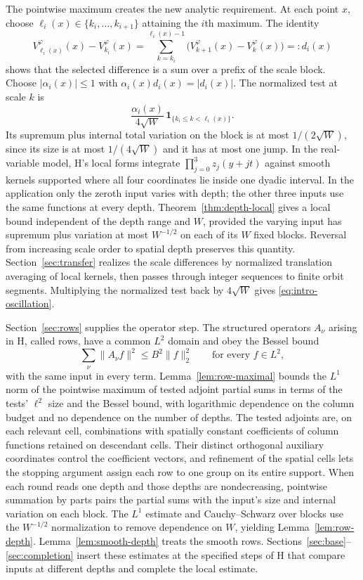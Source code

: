 The pointwise maximum creates the new analytic requirement.  At each point
$x$, choose $\ell_i(x)\in\{k_i,\ldots,k_{i+1}\}$ attaining the $i$th maximum.
The identity
\[
 V_{\ell_i(x)}^\varphi(x)-V_{k_i}^\varphi(x)
 =\sum_{k=k_i}^{\ell_i(x)-1}
       \bigl(V_{k+1}^\varphi(x)-V_k^\varphi(x)\bigr)
 =:d_i(x)
\]
shows that the selected difference is a sum over a prefix of the scale block.
Choose $|\alpha_i(x)|\leq1$ with $\alpha_i(x)d_i(x)=|d_i(x)|$.  The normalized
test at scale $k$ is
\[
 \frac{\alpha_i(x)}{4\sqrt W}\,
       \mathbf1_{\{k_i\leq k<\ell_i(x)\}}.
\]
Its supremum plus internal total variation on the block is at most
$1/(2\sqrt W)$, since its size is at most $1/(4\sqrt W)$ and it has at most
one jump.  In the real-variable model, H's local forms integrate
$\prod_{j=0}^3z_j(y+jt)$ against smooth kernels supported where all four
coordinates lie inside one dyadic interval.
In the application only the zeroth input varies with depth; the other three
inputs use the same functions at every depth.  Theorem~\ref{thm:depth-local}
gives a local bound independent of the depth range and $W$, provided the
varying input has supremum plus variation at most $W^{-1/2}$ on each of its
$W$ fixed blocks.  Reversal from increasing scale order to spatial depth
preserves this quantity.  Section~\ref{sec:transfer} realizes the scale
differences by normalized translation averaging of local kernels, then passes
through integer sequences to finite orbit segments.  Multiplying the normalized test back by
$4\sqrt W$ gives \eqref{eq:intro-oscillation}.

Section~\ref{sec:rows} supplies the operator step.  The structured operators
$A_\nu$ arising in H, called rows, have a common $L^2$ domain and obey the
Bessel bound
\[
 \sum_\nu\|A_\nu f\|^2\leq B^2\|f\|_2^2
 \qquad\text{for every }f\in L^2,
\]
with the same input in every term.  Lemma~\ref{lem:row-maximal} bounds the
$L^1$ norm of the pointwise maximum of tested adjoint partial sums in terms
of the tests' $\ell^2$ size and the Bessel bound, with logarithmic dependence
on the column budget and no dependence on the number of depths.  The tested
adjoints are, on each relevant cell, combinations with spatially constant
coefficients of column functions retained on descendant cells.  Their distinct
orthogonal auxiliary coordinates control the coefficient vectors, and
refinement of the spatial cells lets the stopping argument assign each row to
one group on its entire support.  When each round reads one
depth and those depths are nondecreasing, pointwise summation by parts pairs
the partial sums with the input's size and internal variation on each block.
The $L^1$ estimate and Cauchy--Schwarz over blocks use the $W^{-1/2}$
normalization to remove dependence on $W$, yielding Lemma~\ref{lem:row-depth}.
Lemma~\ref{lem:smooth-depth} treats the smooth rows.
Sections~\ref{sec:base}--\ref{sec:completion} insert these estimates at the
specified steps of H that compare inputs at different depths and complete
the local estimate.
